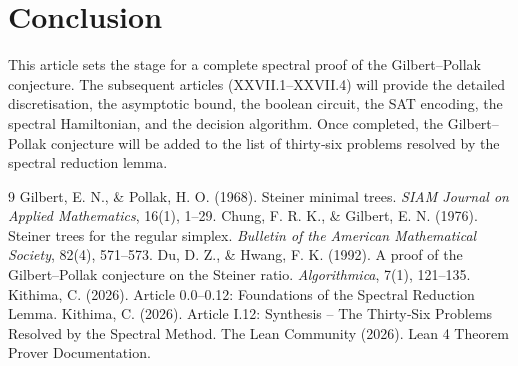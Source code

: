 \documentclass[11pt,a4paper]{article}
\begin{document}
\section{Conclusion}

This article sets the stage for a complete spectral proof of the Gilbert–Pollak conjecture. The subsequent articles (XXVII.1–XXVII.4) will provide the detailed discretisation, the asymptotic bound, the boolean circuit, the SAT encoding, the spectral Hamiltonian, and the decision algorithm. Once completed, the Gilbert–Pollak conjecture will be added to the list of thirty‑six problems resolved by the spectral reduction lemma.


\begin{thebibliography}{9}
  Gilbert, E. N., \& Pollak, H. O. (1968). Steiner minimal trees. \emph{SIAM Journal on Applied Mathematics}, 16(1), 1–29.
  Chung, F. R. K., \& Gilbert, E. N. (1976). Steiner trees for the regular simplex. \emph{Bulletin of the American Mathematical Society}, 82(4), 571–573.
  Du, D. Z., \& Hwang, F. K. (1992). A proof of the Gilbert–Pollak conjecture on the Steiner ratio. \emph{Algorithmica}, 7(1), 121–135.
  Kithima, C. (2026). Article 0.0–0.12: Foundations of the Spectral Reduction Lemma.
  Kithima, C. (2026). Article I.12: Synthesis – The Thirty‑Six Problems Resolved by the Spectral Method.
  The Lean Community (2026). Lean 4 Theorem Prover Documentation.
\end{thebibliography}
\end{document}
